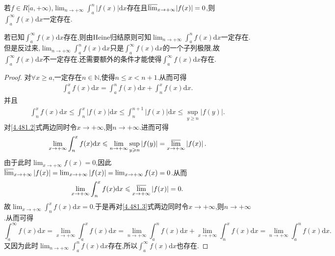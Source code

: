\documentclass[../../main.tex]{subfiles}%
\begin{document}
\begin{proposition}\label{proposition:反常积分与其子列极限存在命题}
若\(f\in R[a, +\infty)\),\(\lim_{n\rightarrow +\infty}\int_a^n|f(x)|\mathrm{d}x\)存在且\({\varlimsup_{x\rightarrow +\infty}}|f(x)| = 0\),则\(\int_a^{\infty}f(x)\mathrm{d}x\)一定存在.
\end{proposition}
\begin{note}
若已知$\int_a^{\infty}f(x)\mathrm{d}x$存在,则由Heine归结原则可知\(\lim_{n\rightarrow +\infty}\int_a^n f(x)\mathrm{d}x\)一定存在.但是反过来,\(\lim_{n\rightarrow +\infty}\int_a^n f(x)\mathrm{d}x\)只是$\int_a^{\infty}f(x)\mathrm{d}x$的一个子列极限,故$\int_a^{\infty}f(x)\mathrm{d}x$不一定存在.还需要额外的条件才能使得$\int_a^{\infty}f(x)\mathrm{d}x$存在.
\end{note}
\begin{proof}
对\(\forall x\geqslant a\),一定存在\(n\in\mathbb{N}\),使得\(n\leqslant x < n + 1\).从而可得
\begin{align}\label{4.481.3}
\int_a^x f(x)\mathrm{d}x=\int_a^n f(x)\mathrm{d}x+\int_n^x f(x)\mathrm{d}x. 
\end{align}
并且
\begin{align}\label{4.481.2}
\int_n^x f(x)\mathrm{d}x\leqslant\int_n^x\left|f(x)\right|\mathrm{d}x\leqslant\int_n^{n + 1}\left|f(x)\right|\mathrm{d}x\leqslant\sup_{y\geqslant n}\left|f(y)\right|.
\end{align}
对\eqref{4.481.2}式两边同时令\(x\rightarrow +\infty\),则\(n\rightarrow +\infty\).进而可得
\[
\lim_{x\rightarrow +\infty}\int_n^x f(x)\mathrm{d}x\leqslant\lim_{n\rightarrow +\infty}\sup_{y\geqslant n}\left|f(y)\right|={\varlimsup_{x\rightarrow +\infty}}\left|f(x)\right|.
\]
由于此时\(\lim_{x\rightarrow +\infty}f(x)=0\),因此\({\varlimsup_{x\rightarrow +\infty}}\left|f(x)\right|=\lim_{x\rightarrow +\infty}\left|f(x)\right|=\lim_{x\rightarrow +\infty}f(x)=0\).从而
\[
\lim_{x\rightarrow +\infty}\int_n^x f(x)\mathrm{d}x\leqslant{\varlimsup_{x\rightarrow +\infty}}\left|f(x)\right|=0.
\]
故\(\lim_{x\rightarrow +\infty}\int_n^x f(x)\mathrm{d}x = 0\).于是再对\eqref{4.481.3}式两边同时令\(x\rightarrow +\infty\),则\(n\rightarrow +\infty\).从而可得
\[
\int_a^{\infty}f(x)\mathrm{d}x=\lim_{x\rightarrow +\infty}\int_a^x f(x)\mathrm{d}x=\lim_{n\rightarrow +\infty}\int_a^n f(x)\mathrm{d}x+\lim_{x\rightarrow +\infty}\int_n^x f(x)\mathrm{d}x=\lim_{n\rightarrow +\infty}\int_a^n f(x)\mathrm{d}x.
\]
又因为此时\(\lim_{n\rightarrow +\infty}\int_a^n f(x)\mathrm{d}x\)存在,所以\(\int_a^{\infty}f(x)\mathrm{d}x\)也存在.
\end{proof}
\end{document}
